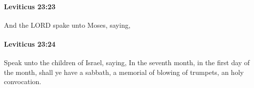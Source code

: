 		\paragraph{Leviticus 23:23} %
			\label{LEVITICUS-23-23}

			And the LORD spake unto Moses, saying,


		\paragraph{Leviticus 23:24} %
			\label{LEVITICUS-23-24}

			Speak unto the children of Israel, saying, In the seventh month, in the first day of the month, shall ye have a sabbath, a memorial of blowing of trumpets, an holy convocation.


